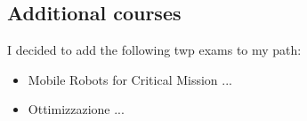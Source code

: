 \subsection{Additional courses}
I decided to add the following twp exams to my path:
\begin{itemize}
    \item Mobile Robots for Critical Mission ...
    \item Ottimizzazione ...
\end{itemize}